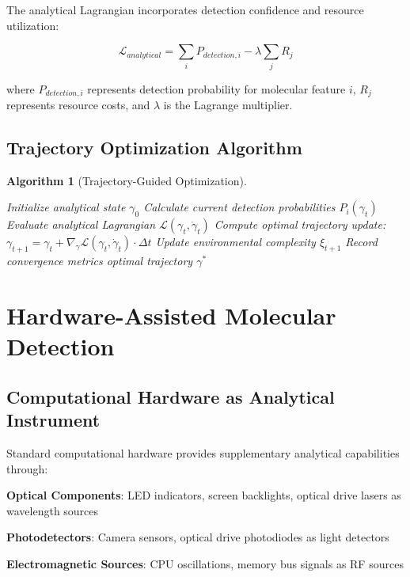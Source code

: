 \documentclass[11pt,a4paper]{article}
\newtheorem{algorithm_def}{Algorithm}
\begin{document}
The analytical Lagrangian incorporates detection confidence and resource utilization:

\begin{equation}
\mathcal{L}_{analytical} = \sum_i P_{detection,i} - \lambda \sum_j R_j
\end{equation}

where $P_{detection,i}$ represents detection probability for molecular feature $i$, $R_j$ represents resource costs, and $\lambda$ is the Lagrange multiplier.

\subsection{Trajectory Optimization Algorithm}

\begin{algorithm_def}[Trajectory-Guided Optimization]
\begin{algorithmic}
\STATE Initialize analytical state $\gamma_0$
    \STATE Calculate current detection probabilities $P_i(\gamma_t)$
    \STATE Evaluate analytical Lagrangian $\mathcal{L}(\gamma_t, \dot{\gamma}_t)$
    \STATE Compute optimal trajectory update:
    \STATE $\gamma_{t+1} = \gamma_t + \nabla_\gamma \mathcal{L}(\gamma_t, \dot{\gamma}_t) \cdot \Delta t$
    \STATE Update environmental complexity $\xi_{t+1}$
    \STATE Record convergence metrics
\ENDFOR
{}
    \RETURN optimal trajectory $\gamma^*$
\ENDIF
\end{algorithmic}
\end{algorithm_def}

\section{Hardware-Assisted Molecular Detection}

\subsection{Computational Hardware as Analytical Instrument}

Standard computational hardware provides supplementary analytical capabilities through:

\textbf{Optical Components}: LED indicators, screen backlights, optical drive lasers as wavelength sources

\textbf{Photodetectors}: Camera sensors, optical drive photodiodes as light detectors

\textbf{Electromagnetic Sources}: CPU oscillations, memory bus signals as RF sources
\end{document}
